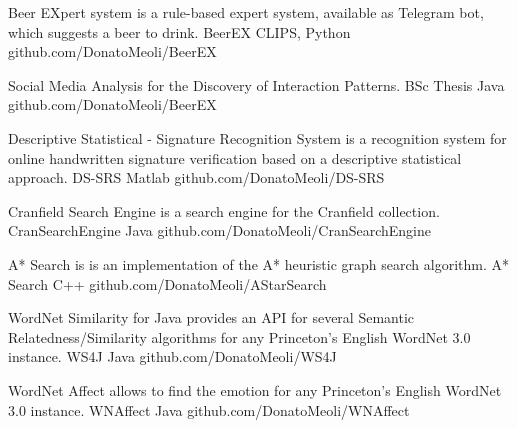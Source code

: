 

\begin{cventries}

  \cventry
    {Beer EXpert system is a rule-based expert system, available as Telegram bot, which suggests a beer to drink.} %
    {BeerEX} %
    {CLIPS, Python} %
    {github.com/DonatoMeoli/BeerEX} %
    {}

  \cventry
    {Social Media Analysis for the Discovery of Interaction Patterns.} %
    {BSc Thesis} %
    {Java} %
    {github.com/DonatoMeoli/BeerEX} %
    {}

  \cventry
    {Descriptive Statistical - Signature Recognition System is a recognition system for online handwritten signature verification based on a descriptive statistical approach.} %
    {DS-SRS} %
    {Matlab} %
    {github.com/DonatoMeoli/DS-SRS} %
    {}

  \cventry
    {Cranfield Search Engine is a search engine for the Cranfield collection.} %
    {CranSearchEngine} %
    {Java} %
    {github.com/DonatoMeoli/CranSearchEngine} %
    {}

  \cventry
    {A* Search is  is an implementation of the A* heuristic graph search algorithm.} %
    {A* Search} %
    {C++} %
    {github.com/DonatoMeoli/AStarSearch} %
    {}

  \cventry
    {WordNet Similarity for Java provides an API for several Semantic Relatedness/Similarity algorithms for any Princeton's English WordNet 3.0 instance.} %
    {WS4J} %
    {Java} %
    {github.com/DonatoMeoli/WS4J} %
    {}

  \cventry
    {WordNet Affect allows to find the emotion for any Princeton's English WordNet 3.0 instance.} %
    {WNAffect} %
    {Java} %
    {github.com/DonatoMeoli/WNAffect} %
    {}

\end{cventries}
